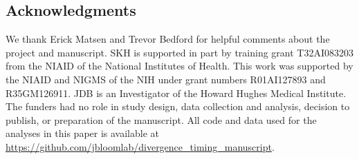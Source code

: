 \documentclass[11pt]{article}
\begin{document}
\subsection*{Acknowledgments}
We thank Erick Matsen and Trevor Bedford for helpful comments about the project and manuscript.
SKH is supported in part by training grant T32AI083203 from the NIAID of the National Institutes of Health.
This work was supported by the NIAID and NIGMS of the NIH under grant numbers R01AI127893 and R35GM126911. 
JDB is an Investigator of the Howard Hughes Medical Institute.
The funders had no role in study design, data collection and analysis, decision to publish, or preparation of the manuscript.
All code and data used for the analyses in this paper is available at \url{https://github.com/jbloomlab/divergence_timing_manuscript}.

\clearpage 

{\small

}
\end{document}
